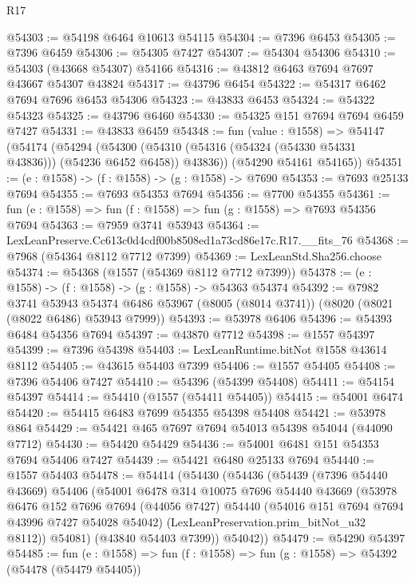 \begin{lexlean}{R17}
\begin{coremodule}
@54303 := @54198 @6464 @10613 @54115
@54304 := @7396 @6453
@54305 := @7396 @6459
@54306 := @54305 @7427
@54307 := @54304 @54306
@54310 := @54303 (@43668 @54307) @54166
@54316 := @43812 @6463 @7694 @7697 @43667 @54307 @43824
@54317 := @43796 @6454
@54322 := @54317 @6462 @7694 @7696 @6453 @54306
@54323 := @43833 @6453
@54324 := @54322 @54323
@54325 := @43796 @6460
@54330 := @54325 @151 @7694 @7694 @6459 @7427
@54331 := @43833 @6459
@54348 := fun (value : @1558) =>
  @54147
    (@54174
      (@54294
        (@54300 (@54310 (@54316 (@54324 (@54330 @54331 @43836))) (@54236 @6452 @6458)) @43836))
      (@54290 @54161 @54165))
@54351 := (e : @1558) -> (f : @1558) -> (g : @1558) -> @7690
@54353 := @7693 @25133 @7694
@54355 := @7693 @54353 @7694
@54356 := @7700 @54355
@54361 := fun (e : @1558) => fun (f : @1558) => fun (g : @1558) => @7693 @54356 @7694
@54363 := @7959 @3741 @53943
@54364 := LexLeanPreserve.Cc613c0d4cdf00b8508ed1a73cd86e17c.R17.__fits_76
@54368 := @7968 (@54364 @8112 @7712 @7399)
@54369 := LexLeanStd.Sha256.choose
@54374 := @54368 (@1557 (@54369 @8112 @7712 @7399))
@54378 := (e : @1558) -> (f : @1558) -> (g : @1558) -> @54363 @54374
@54392 := @7982
    @3741
    @53943
    @54374
    @6486
    @53967
    (@8005 (@8014 @3741))
    (@8020 (@8021 (@8022 @6486) @53943 @7999))
@54393 := @53978 @6406
@54396 := @54393 @6484 @54356 @7694
@54397 := @43870 @7712
@54398 := @1557 @54397
@54399 := @7396 @54398
@54403 := LexLeanRuntime.bitNot @1558 @43614 @8112
@54405 := @43615 @54403 @7399
@54406 := @1557 @54405
@54408 := @7396 @54406 @7427
@54410 := @54396 (@54399 @54408)
@54411 := @54154 @54397
@54414 := @54410 (@1557 (@54411 @54405))
@54415 := @54001 @6474
@54420 := @54415 @6483 @7699 @54355 @54398 @54408
@54421 := @53978 @864
@54429 := @54421 @465 @7697 @7694 @54013 @54398 @54044 (@44090 @7712)
@54430 := @54420 @54429
@54436 := @54001 @6481 @151 @54353 @7694 @54406 @7427
@54439 := @54421 @6480 @25133 @7694
@54440 := @1557 @54403
@54478 := @54414
    (@54430
      (@54436
        (@54439
          (@7396 @54440 @43669)
          @54406
          (@54001
            @6478
            @314
            @10075
            @7696
            @54440
            @43669
            (@53978
              @6476
              @152
              @7696
              @7694
              (@44056 @7427)
              @54440
              (@54016 @151 @7694 @7694 @43996 @7427 @54028 @54042)
              (LexLeanPreservation.prim_bitNot_u32 @8112))
            @54081)
          (@43840 @54403 @7399))
        @54042))
@54479 := @54290 @54397
@54485 := fun (e : @1558) => fun (f : @1558) => fun (g : @1558) => @54392 (@54478 (@54479 @54405))

\end{coremodule}
\end{lexlean}
